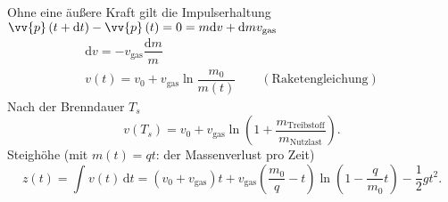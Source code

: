 \documentclass[a4paper,12pt]{article}
\newcommand{\td}{\,\text{d}}
\numberwithin{equation}{section}
\begin{document}
Ohne eine äußere Kraft gilt die Impulserhaltung $\vv{p}\left(t+\text{d}t\right)-\vv{p}\left(t\right)=0=m \text{d}v+\text{d}mv_{\text{gas}}$ 
\begin{gather*}
        \text{d}v=-v_{\text{gas}}\dfrac{\text{d}m}{m}\\
        v\left(t\right)=v_0+v_{\text{gas}}\ln\dfrac{m_0}{m\left(t\right)}\qquad \left(\text{Raketengleichung}\right)
\end{gather*}
Nach der Brenndauer $T_s$ 
\[ 
        v\left(T_s\right)=v_0+v_{\text{gas}}\ln\left(1+\dfrac{m_{\text{Treibstoff} }}{m_{\text{Nutzlast} }}\right)
.\] 
Steighöhe (mit $m\left(t\right)=qt$: der Massenverlust pro Zeit)
\[ 
        z\left(t\right)=\int_{}^{}v\left(t\right)\td t=\left(v_0+v_{\text{gas}}\right)t+v_{\text{gas}}\left(\dfrac{m_0}{q}-t\right)\ln\left(1-\dfrac{q}{m_0}t\right)-\dfrac{1}{2}gt^2
.\]
\end{document}
